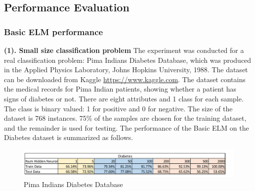 \documentclass[a4paper, 14pt]{extarticle}
\begin{document}
\subsection{Performance Evaluation}
\subsubsection{Basic ELM performance}
\par \textbf{(1). Small size classification problem} \newline\newline
     The experiment was conducted for a real classification problem: Pima Indians Diabetes Database, which was produced in the Applied Physics Laboratory, Johns Hopkins University, 1988. The dataset can be downloaded from Kaggle \url{https://www.kaggle.com}. The dataset contains the medical records for Pima Indian patients, showing whether a patient has signs of diabetes or not. There are eight attributes and 1 class for each sample. The class is binary valued: 1 for positive and 0 for negative. The size of the dataset is 768 instances. 75\% of the samples are chosen for the training dataset, and the remainder is used for testing. \newline\newline
     The performance of the Basic ELM on the Diabetes dataset is summarized as follows.
     \begin{figure}[H]
\centering
\includegraphics[width=1.1\textwidth]{3_1.png}
\caption{\label{fig:Diabetes}Pima Indians Diabetes Database}
\end{figure}
\end{document}
